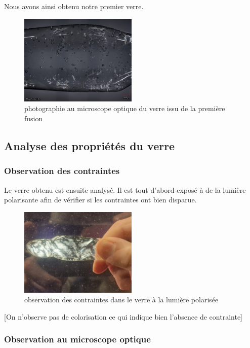 \documentclass{article}
\begin{document}
Nous avons ainsi obtenu notre premier verre.

\begin{figure}[h]
    \centering
    \includegraphics[width=0.5\textwidth]{photos/mosaic.jpg}
    \caption{photographie au microscope optique du verre issu de la première fusion}
\end{figure}

\subsection{Analyse des propriétés du verre}

\subsubsection{Observation des contraintes}
Le verre obtenu est ensuite analysé. Il est tout d'abord exposé à de la lumière polarisante afin de vérifier si les contraintes ont bien disparue.

\begin{figure}[h]
    \centering
    \includegraphics[width=0.5\textwidth]{photos/contraintes.jpg}
    \caption{observation des contraintes dans le verre à la lumière polarisée}
\end{figure}


[On n'observe pas de colorisation ce qui indique bien l'absence de contrainte]

\subsubsection{Observation au microscope optique}
\end{document}
